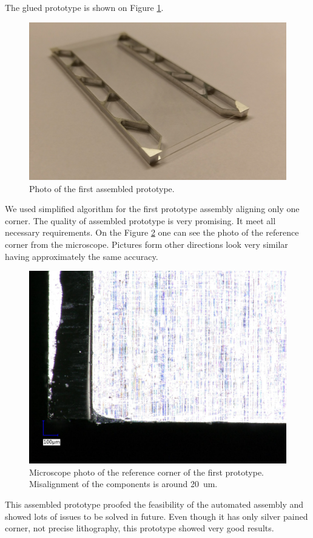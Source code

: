 The glued prototype is shown on Figure \ref{fig:module_prototype}.

\begin{figure}[ht]\centering
\includegraphics[width=1\linewidth]{Data/Precision_tests/Prototype_photo.png}
\caption{Photo of the first assembled prototype.}
\label{fig:module_prototype}
\end{figure}

We used simplified algorithm for the first prototype assembly aligning only one corner. The quality of assembled prototype is very promising. It meet all necessary requirements. On the Figure \ref{fig:prototype_macro} one can see the photo of the reference corner from the microscope. Pictures form other directions look very similar having approximately the same accuracy.

\begin{figure}[ht]\centering
\includegraphics[width=1\linewidth]{Data/Precision_tests/Top_sensor_X_view.png}
\caption{Microscope photo of the reference corner of the first prototype. Misalignment of the components is around 20~um.}
\label{fig:prototype_macro}
\end{figure}

This assembled prototype proofed the feasibility of the automated assembly and showed lots of issues to be solved in future. Even though it has only silver pained corner, not precise lithography, this prototype showed very good results.
